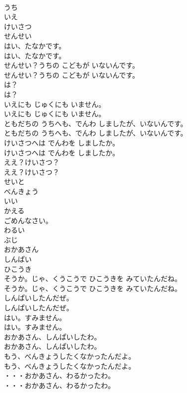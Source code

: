 \documentclass[8pt]{extreport}
\begin{document}
\begin{CJK}{UTF8}{min}
\\	うち 
\\	いえ
\\	けいさつ
\\	せんせい
\\	はい、たなかです。	
\\	はい、たなかです。 
\\	せんせい？うちの こどもが いないんです。	
\\	せんせい？うちの こどもが いないんです。 
\\	は？	
\\	は？ 
\\	いえにも じゅくにも いません。	
\\	いえにも じゅくにも いません。 
\\	ともだちの うちへも、でんわ しましたが、いないんです。	
\\	ともだちの うちへも、でんわ しましたが、いないんです。 
\\	けいさつへは でんわを しましたか。	
\\	けいさつへは でんわを しましたか。 
\\	ええ？けいさつ？	
\\	ええ？けいさつ？ 
\\	せいと
\\	べんきょう
\\	いい
\\	かえる
\\	ごめんなさい。
\\	わるい
\\	ぶじ
\\	おかあさん
\\	しんぱい
\\	ひこうき
\\	そうか。じゃ、くうこうで ひこうきを みていたんだね。	
\\	そうか。じゃ、くうこうで ひこうきを みていたんだね。 
\\	しんぱいしたんだぜ。	
\\	しんぱいしたんだぜ。 
\\	はい。すみません。	
\\	はい。すみません。 
\\	おかあさん、しんぱいしたわ。	
\\	おかあさん、しんぱいしたわ。 
\\	もう、べんきょうしたくなかったんだよ。	
\\	もう、べんきょうしたくなかったんだよ。 
\\	・・・おかあさん、わるかったわ。	
\\	・・・おかあさん、わるかったわ。 

\end{CJK}
\end{document}
